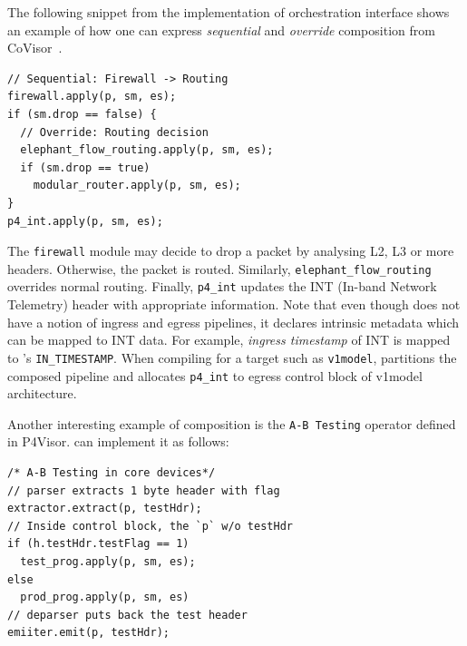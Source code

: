 \documentclass[letterpaper,twocolumn,10pt]{article}
\begin{document}
%
The following \ulang snippet from the implementation of orchestration
interface shows an example of how one can express \emph{sequential}
and \emph{override} composition from CoVisor~\cite{188954}.
\begin{lstlisting}[frame=none, escapechar=!]
// Sequential: Firewall -> Routing
firewall.apply(p, sm, es);
if (sm.drop == false) {
  // Override: Routing decision
  elephant_flow_routing.apply(p, sm, es);
  if (sm.drop == true) 
    modular_router.apply(p, sm, es);
}
p4_int.apply(p, sm, es);
\end{lstlisting}
The \texttt{firewall} module may decide to drop a packet by analysing
L2, L3 or more headers. Otherwise, the packet is routed.  Similarly,
\texttt{elephant\_flow\_routing} overrides normal routing. Finally,
\texttt{p4\_int} updates the INT (In-band Network Telemetry)
\cite{Kim2015InbandNT, p4int} header with appropriate information.
Note that even though \uarch does not have a notion of ingress and
egress pipelines, it declares intrinsic metadata which can be mapped
to INT data. For example, \emph{ingress timestamp} of INT is mapped to
\ulang's \texttt{IN\_TIMESTAMP}. When compiling for a target such as
\texttt{v1model}, \ucomp partitions the composed pipeline and
allocates \texttt{p4\_int} to egress control block of v1model
architecture. 

Another interesting example of composition is the \texttt{A-B Testing}
operator defined in P4Visor\cite{Zheng:2018:PLV:3281411.3281436}.
\ulang can implement it as follows:
\begin{lstlisting}[frame=none, escapechar=!]
/* A-B Testing in core devices*/
// parser extracts 1 byte header with flag
extractor.extract(p, testHdr);
// Inside control block, the `p` w/o testHdr
if (h.testHdr.testFlag == 1)
  test_prog.apply(p, sm, es);
else
  prod_prog.apply(p, sm, es)
// deparser puts back the test header
emiiter.emit(p, testHdr);
\end{lstlisting}
\end{document}
